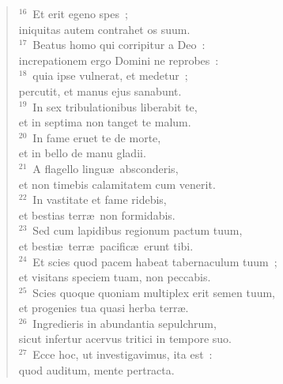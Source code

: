 \begin{flushleft}
\begin{verse}
${}^{16}$~Et erit egeno spes~;\\ iniquitas autem contrahet os suum.\\
${}^{17}$~Beatus homo qui corripitur a Deo~:\\ increpationem ergo Domini ne reprobes~:\\
${}^{18}$~quia ipse vulnerat, et medetur~;\\ percutit, et manus ejus sanabunt.\\
${}^{19}$~In sex tribulationibus liberabit te,\\ et in septima non tanget te malum.\\
${}^{20}$~In fame eruet te de morte,\\ et in bello de manu gladii.\\
${}^{21}$~A flagello lingu\ae\ absconderis,\\ et non timebis calamitatem cum venerit.\\
${}^{22}$~In vastitate et fame ridebis,\\ et bestias terr\ae\ non formidabis.\\
${}^{23}$~Sed cum lapidibus regionum pactum tuum,\\ et besti\ae\ terr\ae\ pacific\ae\ erunt tibi.\\
${}^{24}$~Et scies quod pacem habeat tabernaculum tuum~;\\ et visitans speciem tuam, non peccabis.\\
${}^{25}$~Scies quoque quoniam multiplex erit semen tuum,\\ et progenies tua quasi herba terr\ae .\\
${}^{26}$~Ingredieris in abundantia sepulchrum,\\ sicut infertur acervus tritici in tempore suo.\\
${}^{27}$~Ecce hoc, ut investigavimus, ita est~:\\ quod auditum, mente pertracta.\end{verse}\end{flushleft}



